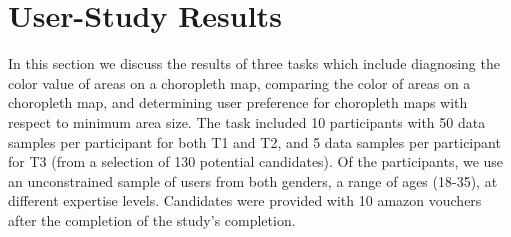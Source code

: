 \section{User-Study Results} \label{sec:results}
In this section we discuss the results of three tasks which include diagnosing the color value of areas on a choropleth map, comparing the color of areas on a choropleth map, and determining user preference for choropleth maps with respect to minimum area size. The task included 10 participants with 50 data samples per participant for both T1 and T2, and 5 data samples per participant for T3 (from a selection of 130 potential candidates). Of the participants, we use an unconstrained sample of users from both genders, a range of ages (18-35), at different expertise levels. Candidates were provided with {\textsterling}10 amazon vouchers after the completion of the study's completion.
